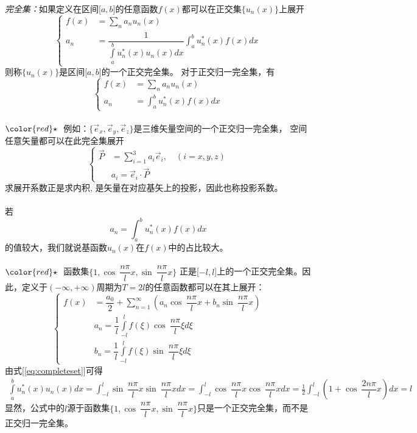 \emph{完全集：}如果定义在区间[$a,b$]的任意函数$f(x)$都可以在正交集$\{ u_n (x)\}$上展开
\begin{equation}\label{eq:completeset}
 \left \{ 
\begin{aligned}
f(x)&= \sum_n a_n u_n (x)  \\
 a_n &= \dfrac{1}{\int\limits_a ^b u_n^* (x) u_n (x) dx}\int_a ^b u_n^* (x) f(x) dx 
\end{aligned} \right.
\end{equation}
则称$\{ u_n (x)\}$是区间[$a,b$]的一个正交完全集。
对于正交归一完全集，有
  $$ \left \{ 
  \begin{aligned}
  f(x)&= \sum_n a_n u_n (x)  \\
   a_n &= \int_a ^b u_n^* (x) f(x) dx 
  \end{aligned} \right.
  $$	
  ~~\\ ${\color{red}\star}~$ 例如：$\{\vec{e}_x, \vec{e}_y, \vec{e}_z\}$是三维矢量空间的一个正交归一完全集， 空间任意矢量都可以在此完全集展开 
 \[ \left \{ 
	\begin{aligned}
	 \vec{P} &= \sum_{i=1}^{3} a_i \vec{e}_i, \quad (i=x,y,z) \\
	 & a_i = \vec{e}_i \cdot \vec{P}
	\end{aligned} \right.\]
  求展开系数正是求内积, 是矢量在对应基矢上的投影，因此也称投影系数。\\
  ~~\\
  若
  \[a_n = \int_a ^b u_n^* (x) f(x) dx \]
  的值较大，我们就说基函数$u_n(x)$在$f(x)$中的占比较大。\\
~~\\ 
${\color{red}\star}~$ 函数集$\displaystyle \{1, \cos~ \dfrac{n\pi}{l} x,\sin~ \dfrac{n\pi}{l} x \}$ 正是[$-l,l$]上的一个正交完全集。因此，定义于$(-\infty,+\infty)$周期为$T=2l$的任意函数都可以在其上展开：
  $$ \left\{ \begin{aligned}
	  f(x) &=\dfrac{a_0}{2} +\sum\limits_{n=1}^{\infty}  \left(  a_n \cos~ \dfrac{n\pi}{l} x +  b_n \sin~ \dfrac{n\pi}{l} x  \right) \\ 
	  &a_n =\dfrac{1}{l}  \int\limits_{-l}^{l}  f(\xi )   \cos~ \dfrac{n\pi}{l} \xi d\xi \\
	  &b_n =\dfrac{1}{l}  \int\limits_{-l}^{l}  f(\xi )   \sin~ \dfrac{n\pi}{l} \xi d\xi  
  \end{aligned} \right. $$
  由式[\ref{eq:completeset}]可得
  \[ \begin{aligned} \int\limits_a ^b u_n^* (x) u_n (x) dx = \int_{-l}^l \sin~ \dfrac{n\pi}{l} x \sin~ \dfrac{n\pi}{l} x dx = \int_{-l}^l \cos~ \dfrac{n\pi}{l} x \cos~ \dfrac{n\pi}{l} x dx 
	= \frac{1}{2} \int_{-l}^l \left(1+ \cos~ \dfrac{2n\pi}{l} x \right)dx  
	= l
\end{aligned} \]
显然，公式中的$l$源于函数集$\displaystyle \{1, \cos~ \dfrac{n\pi}{l} x,\sin~ \dfrac{n\pi}{l} x \}$只是一个正交完全集，而不是正交归一完全集。

